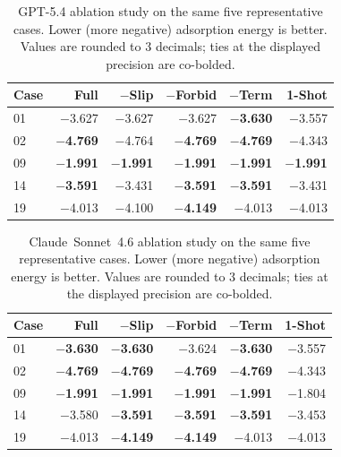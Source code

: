 \begin{table}[t]
\centering
\caption{GPT-5.4 ablation study on the same five representative cases. Lower (more negative) adsorption energy is better. Values are rounded to 3 decimals; ties at the displayed precision are co-bolded.}
\label{tab:ablation-gpt54}
\begin{tabular}{lrrrrr}
\toprule
Case & Full & $-$Slip & $-$Forbid & $-$Term & 1-Shot \\
\midrule
01 & $-$3.627 & $-$3.627 & $-$3.627 & \textbf{$-$3.630} & $-$3.557 \\
02 & \textbf{$-$4.769} & $-$4.764 & \textbf{$-$4.769} & \textbf{$-$4.769} & $-$4.343 \\
09 & \textbf{$-$1.991} & \textbf{$-$1.991} & \textbf{$-$1.991} & \textbf{$-$1.991} & \textbf{$-$1.991} \\
14 & \textbf{$-$3.591} & $-$3.431 & \textbf{$-$3.591} & \textbf{$-$3.591} & $-$3.431 \\
19 & $-$4.013 & $-$4.100 & \textbf{$-$4.149} & $-$4.013 & $-$4.013 \\
\bottomrule
\end{tabular}
\end{table}

\begin{table}[t]
\centering
\caption{Claude~Sonnet~4.6 ablation study on the same five representative cases. Lower (more negative) adsorption energy is better. Values are rounded to 3 decimals; ties at the displayed precision are co-bolded.}
\label{tab:ablation-claude}
\begin{tabular}{lrrrrr}
\toprule
Case & Full & $-$Slip & $-$Forbid & $-$Term & 1-Shot \\
\midrule
01 & \textbf{$-$3.630} & \textbf{$-$3.630} & $-$3.624 & \textbf{$-$3.630} & $-$3.557 \\
02 & \textbf{$-$4.769} & \textbf{$-$4.769} & \textbf{$-$4.769} & \textbf{$-$4.769} & $-$4.343 \\
09 & \textbf{$-$1.991} & \textbf{$-$1.991} & \textbf{$-$1.991} & \textbf{$-$1.991} & $-$1.804 \\
14 & $-$3.580 & \textbf{$-$3.591} & \textbf{$-$3.591} & \textbf{$-$3.591} & $-$3.453 \\
19 & $-$4.013 & \textbf{$-$4.149} & \textbf{$-$4.149} & $-$4.013 & $-$4.013 \\
\bottomrule
\end{tabular}
\end{table}

